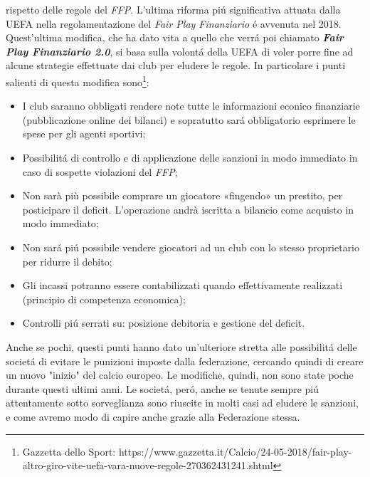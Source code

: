 \documentclass[
    corpo=12pt,
    oneside,
    evenboxes,
    tipotesi=triennale,
    stile=classica,
    oldstyle,
    autoretitolo,
    greek,
]{toptesi}
\begin{document}
\begin{interlinea}{1.5}
rispetto delle regole del \emph{FFP}.\newline
L'ultima riforma pi\'u significativa attuata dalla UEFA nella regolamentazione del \emph{Fair Play Finanziario} \'e avvenuta nel 2018.
Quest'ultima modifica, che ha dato vita a quello che verr\'a poi chiamato \emph{\textbf{Fair Play Finanziario 2.0}}, si basa sulla volont\'a della
UEFA di voler porre fine ad alcune strategie effettuate dai club per eludere le regole. In particolare i punti 
salienti di questa modifica sono\footnote{Gazzetta dello Sport: https://www.gazzetta.it/Calcio/24-05-2018/fair-play-altro-giro-vite-uefa-vara-nuove-regole-270362431241.shtml}:
\begin{itemize}
    \item I club saranno obbligati rendere note tutte le informazioni econico finanziarie (pubblicazione online dei bilanci) e 
    sopratutto sar\'a obbligatorio esprimere le spese per gli agenti sportivi;
    \item Possibilit\'a di controllo e di applicazione delle sanzioni in modo immediato in caso di sospette violazioni del \emph{FFP};
    \item Non sarà più possibile comprare un giocatore «fingendo» un prestito, per posticipare il deficit. L’operazione andrà iscritta 
    a bilancio come acquisto in modo immediato;
    \item Non sar\'a pi\'u possibile vendere giocatori ad un club con lo stesso proprietario per ridurre il debito;
    \item Gli incassi potranno essere contabilizzati quando effettivamente realizzati \linebreak (principio di competenza economica);
    \item Controlli pi\'u serrati su: posizione debitoria e gestione del deficit.
\end{itemize}
Anche se pochi, questi punti hanno dato un'ulteriore stretta alle possibilit\'a delle societ\'a di evitare le punizioni imposte dalla federazione,
cercando quindi di creare un nuovo "inizio" del calcio europeo.\newline
Le modifiche, quindi, non sono state poche durante questi ultimi anni. Le societ\'a, per\'o, anche se tenute sempre pi\'u attentamente
sotto sorveglianza sono riuscite in molti casi ad eludere le sanzioni, e come avremo modo di capire anche grazie alla Federazione stessa.

\end{interlinea}
\end{document}
